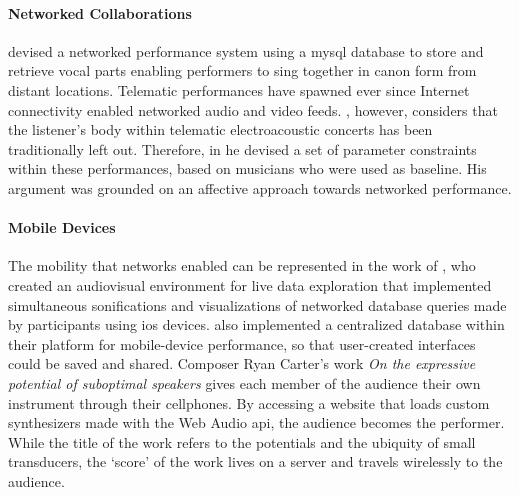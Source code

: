 {	\paragraph{Networked Collaborations}
	\citeauthor{Nakamoto2007} \parencite{Nakamoto2007} devised a networked performance system using a \gls{mysql} database to store and retrieve vocal parts enabling performers to sing together in canon form from distant locations. Telematic performances have spawned ever since Internet connectivity enabled networked audio and video feeds. \citeauthor{icmc/bbp2372.2014.046} \parencite{icmc/bbp2372.2014.046}, however, considers that the listener's body within telematic electroacoustic concerts has been traditionally left out. Therefore, in he devised a set of parameter constraints within these performances, based on musicians who were used as baseline. His argument was grounded on an affective approach towards networked performance. 

	\paragraph{Mobile Devices}
	The mobility that networks enabled can be represented in the work of 
	\citeauthor{Liu:2013} \parencite{Liu:2013}, who created an audiovisual environment for live data exploration that implemented simultaneous sonifications and visualizations of networked database queries made by participants using \gls{ios} devices. \citeauthor{btaylor:2014} \parencite{btaylor:2014} also implemented a centralized database within their platform for mobile-device performance, so that user-created interfaces could be saved and shared. Composer Ryan Carter's work \textit{On the expressive potential of suboptimal speakers} \parencite{Rya17:OnT} gives each member of the audience their own instrument through their cellphones. By accessing a website that loads custom synthesizers made with the Web Audio \gls{api}, the audience becomes the performer. While the title of the work refers to the potentials and the ubiquity of small transducers, the `score' of the work lives on a server and travels wirelessly to the audience.

}
